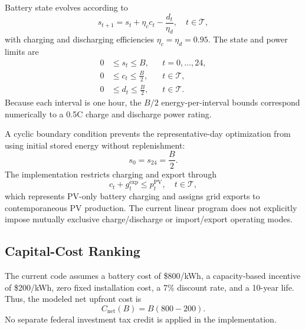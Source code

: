 \documentclass[journal]{IEEEtran}
\begin{document}
Battery state evolves according to
\begin{equation}
s_{t+1}=s_t+\eta_c c_t-\frac{d_t}{\eta_d},
\quad t\in\mathcal{T},
\label{eq:soc}
\end{equation}
with charging and discharging efficiencies $\eta_c=\eta_d=0.95$. The state and power limits are
\begin{align}
0 &\le s_t \le B, &&t=0,\ldots,24, \label{eq:soc_limits}\\
0 &\le c_t \le \frac{B}{2}, &&t\in\mathcal{T}, \label{eq:charge_limit}\\
0 &\le d_t \le \frac{B}{2}, &&t\in\mathcal{T}. \label{eq:discharge_limit}
\end{align}
Because each interval is one hour, the $B/2$ energy-per-interval bounds correspond numerically to a 0.5C charge and discharge power rating.

A cyclic boundary condition prevents the representative-day optimization from using initial stored energy without replenishment:
\begin{equation}
s_0=s_{24}=\frac{B}{2}.
\label{eq:cyclic_soc}
\end{equation}
The implementation restricts charging and export through
\begin{equation}
c_t+g_t^{\mathrm{exp}}\le p_t^{\mathrm{PV}},
\quad t\in\mathcal{T},
\label{eq:pv_only}
\end{equation}
which represents PV-only battery charging and assigns grid exports to contemporaneous PV production. The current linear program does not explicitly impose mutually exclusive charge/discharge or import/export operating modes.

\subsection{Capital-Cost Ranking}
The current code assumes a battery cost of \$800/kWh, a capacity-based incentive of \$200/kWh, zero fixed installation cost, a 7\% discount rate, and a 10-year life. Thus, the modeled net upfront cost is
\begin{equation}
C_{\mathrm{net}}(B)=B(800-200).
\label{eq:net_capital}
\end{equation}
No separate federal investment tax credit is applied in the implementation.
\end{document}
